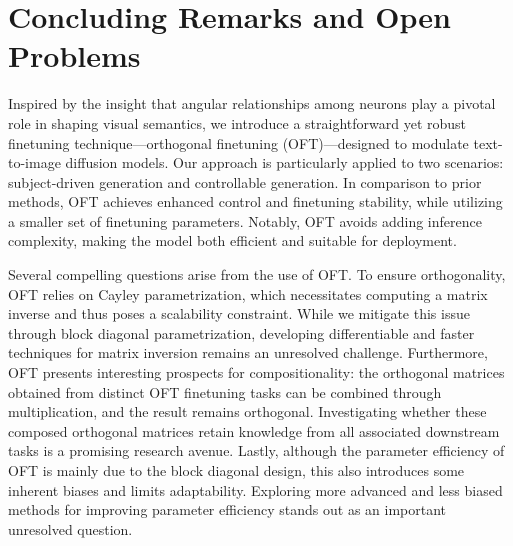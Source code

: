 \section{Concluding Remarks and Open Problems}

Inspired by the insight that angular relationships among neurons play a pivotal role in shaping visual semantics, we introduce a straightforward yet robust finetuning technique—orthogonal finetuning (OFT)—designed to modulate text-to-image diffusion models. Our approach is particularly applied to two scenarios: subject-driven generation and controllable generation. In comparison to prior methods, OFT achieves enhanced control and finetuning stability, while utilizing a smaller set of finetuning parameters. Notably, OFT avoids adding inference complexity, making the model both efficient and suitable for deployment.

Several compelling questions arise from the use of OFT. To ensure orthogonality, OFT relies on Cayley parametrization, which necessitates computing a matrix inverse and thus poses a scalability constraint. While we mitigate this issue through block diagonal parametrization, developing differentiable and faster techniques for matrix inversion remains an unresolved challenge. Furthermore, OFT presents interesting prospects for compositionality: the orthogonal matrices obtained from distinct OFT finetuning tasks can be combined through multiplication, and the result remains orthogonal. Investigating whether these composed orthogonal matrices retain knowledge from all associated downstream tasks is a promising research avenue. Lastly, although the parameter efficiency of OFT is mainly due to the block diagonal design, this also introduces some inherent biases and limits adaptability. Exploring more advanced and less biased methods for improving parameter efficiency stands out as an important unresolved question.